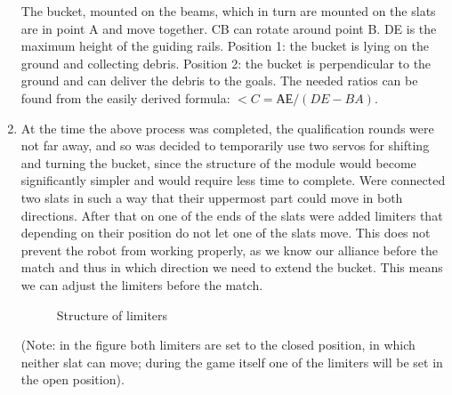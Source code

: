 \begin{enumerate}
\begin{figure}[h]
\begin{minipage}[h]{1\linewidth}
   	\end{minipage}
  \end{figure}	
  The bucket, mounted on the beams, which in turn are mounted on the slats are in point A and move together. CB can rotate around point B. DE is the maximum height of the guiding rails. 
  Position 1: the bucket is lying on the ground and collecting debris. Position 2: the bucket is perpendicular to the ground and can deliver the debris to the goals. The needed ratios can be found from the easily derived formula: $<C = АЕ/(DE - BA)$.
  \item At the time the above process was completed, the qualification rounds were not far away, and so was decided to temporarily use two servos for shifting and turning the bucket, since the structure of the module would become significantly simpler and would require less time to complete. Were connected two slats in such a way that their uppermost part could move in both directions. After that on one of the ends of the slats were added limiters that depending on their position do not let one of the slats move. This does not prevent the robot from working properly, as we know our alliance before the match and thus in which direction we need to extend the bucket. This means we can adjust the limiters before the match.
  \begin{figure}[h]
  	\begin{minipage}[h]{1\linewidth}
  		\caption{Structure of limiters}
  	\end{minipage}
  \end{figure}
  (Note: in the figure both limiters are set to the closed position, in which neither slat can move; during the game itself one of the limiters will be set in the open position). 
  

\end{enumerate}
